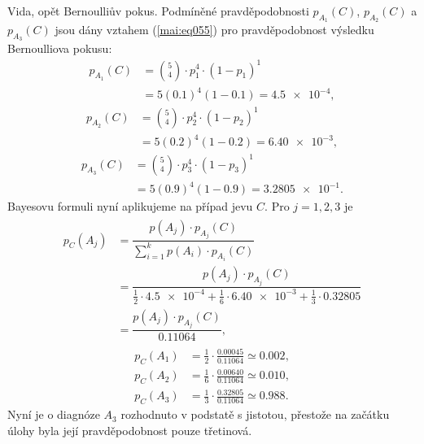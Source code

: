 \begin{mdframed}[style=mdexam]
\begin{example}
    Vida, opět Bernoulliův pokus. Podmíněné pravděpodobnosti \(p_{A_1}(C)\), \(p_{A_2}(C)\) a
    \(p_{A_3}(C)\) jsou dány vztahem (\ref{mai:eq055}) pro pravděpodobnost výsledku Bernoulliova
    pokusu:
    \begin{align*}
      p_{A_1}(C) &= \binom{5}{4}\cdot p_1^4\cdot(1-p_1)^1   \\
                 &= 5(\num{0.1})^4(1 - \num{0.1}) = \num{4.5e-4},                   
    \end{align*}
    \begin{align*}
      p_{A_2}(C) &= \binom{5}{4}\cdot p_2^4\cdot(1-p_2)^1   \\
                 &= 5(\num{0.2})^4(1 - \num{0.2}) = \num{6.40e-3},                 
    \end{align*}
    \begin{align*}
      p_{A_3}(C) &= \binom{5}{4}\cdot p_3^4\cdot(1-p_3)^1   \\
                 &= 5(\num{0.9})^4(1 - \num{0.9}) = \num{3.2805e-1}. 
    \end{align*}
    Bayesovu formuli nyní aplikujeme na případ jevu \(C\). Pro \(j = 1, 2, 3\) je
    \begin{gather*}
      \begin{aligned}
        p_C(A_j) &= \dfrac{p(A_j)\cdot p_{A_j}(C)}{\sum_{i=1}^{k}p(A_i)\cdot p_{A_i}(C)}  \\
                 &= \dfrac{p(A_j)\cdot p_{A_j}(C)}{\frac{1}{2}\cdot\num{4.5e-4} + 
                                                  \frac{1}{6}\cdot\num{6.40e-3} + 
                                                  \frac{1}{3}\cdot\num{0.32805}}         \\
                 &= \dfrac{p(A_j)\cdot p_{A_j}(C)}{\num{0.11064}},
      \end{aligned}
    \end{gather*}
    \begin{align*}
      p_C(A_1) &= \frac{1}{2} \cdot\frac{\num{0.00045}}{\num{0.11064}}\simeq\num{0.002},     \\
      p_C(A_2) &= \frac{1}{6} \cdot\frac{\num{0.00640}}{\num{0.11064}}\simeq\num{0.010},     \\
      p_C(A_3) &= \frac{1}{3} \cdot\frac{\num{0.32805}}{\num{0.11064}}\simeq\num{0.988}.
    \end{align*}
    Nyní je o diagnóze \(A_3\) rozhodnuto v podstatě s jistotou, přestože na začátku úlohy byla její
    pravděpodobnost pouze třetinová.
  \end{example}
\end{mdframed}